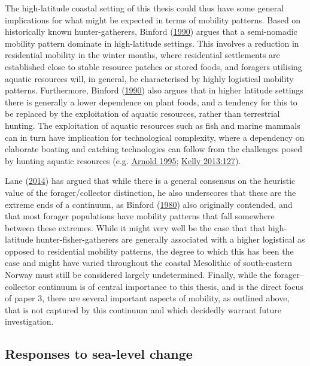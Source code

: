 \documentclass[
  12pt,
  a4paper,
  oneside]{book}
\begin{document}
The high-latitude coastal setting of this thesis could thus have some general implications for what might be expected in terms of mobility patterns. Based on historically known hunter-gatherers, Binford (\protect\hyperlink{ref-binford1990}{1990}) argues that a semi-nomadic mobility pattern dominate in high-latitude settings. This involves a reduction in residential mobility in the winter months, where residential settlements are established close to stable resource patches or stored foods, and foragers utilising aquatic resources will, in general, be characterised by highly logistical mobility patterns. Furthermore, Binford (\protect\hyperlink{ref-binford1990}{1990}) also argues that in higher latitude settings there is generally a lower dependence on plant foods, and a tendency for this to be replaced by the exploitation of aquatic resources, rather than terrestrial hunting. The exploitation of aquatic resources such as fish and marine mammals can in turn have implication for technological complexity, where a dependency on elaborate boating and catching technologies can follow from the challenges posed by hunting aquatic resources (e.g. \protect\hyperlink{ref-arnold1995}{Arnold 1995}; \protect\hyperlink{ref-kelly2013}{Kelly 2013:127}).

Lane (\protect\hyperlink{ref-lane2014}{2014}) has argued that while there is a general consensus on the heuristic value of the forager/collector distinction, he also underscores that these are the extreme ends of a continuum, as Binford (\protect\hyperlink{ref-binford1980}{1980}) also originally contended, and that most forager populations have mobility patterns that fall somewhere between these extremes. While it might very well be the case that that high-latitude hunter-fisher-gatherers are generally associated with a higher logistical as opposed to residential mobility patterns, the degree to which this has been the case and might have varied throughout the coastal Mesolithic of south-eastern Norway must still be considered largely undetermined. Finally, while the forager--collector continuum is of central importance to this thesis, and is the direct focus of paper 3, there are several important aspects of mobility, as outlined above, that is not captured by this continuum and which decidedly warrant future investigation.

\hypertarget{responses-to-sea-level-change}{%
\subsection{Responses to sea-level change}\label{responses-to-sea-level-change}}
\end{document}

